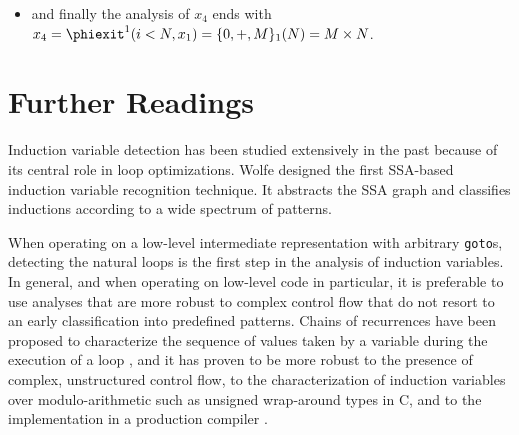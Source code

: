 {\begin{itemize}
\begin{itemize}
\begin{itemize}
    \item the analysis of $x_0$ leads to $x_0 = 0$
    \item analyzing $x_2$ triggers the analysis of $j$, $M$, and $x_3$
      \begin{itemize}
      \item $j = \CHREC{0, +, 1}_2$ i.e., the canonical loop counter $l_2$ of $\textit{loop}_2$.
      \item $M$ is a parameter
      \item $x_3 = \phientry^2 (x_1, x_3 + 1) = \CHREC{x_1, +, 1}_2$
      \end{itemize}
    \item $x_2 = \phientry^2 (j < M, x_3)$ is then computed as the last value of $x_3$ after
      $\textit{loop}_2$, i.e., it is the chain of recurrence of $x_3$ applied
      to the first iteration of $\textit{loop}_2$ that does not satisfy $j < M$ or equivalently $l_2<M$. The corresponding Diophantine inequality $l_2\geq M$  have minimum solution $l_2=M$. So, to finish the computation of the scalar evolution of
      $x_2$ we apply $M$ to the scalar evolution of $x_3$, leading
      to $x_2 = \CHREC{x_1, +, 1}_2 (M) = x_1 + M$;
    \end{itemize}
  \item the scalar evolution analysis of $x_1$ then leads to $x_1 = \phientry^1 (x_0, x_2) = \phientry^1 (x_0, x_1 + M) = \CHREC{x_0, +, M}_1 = \CHREC{0, +, M}_1$
  \end{itemize}
\item and finally the analysis of $x_4$ ends with $x_4 = \phiexit^1 (i< N, x_1) = \CHREC{0, +, M}_1 (N) = M \times N$.
\end{itemize}


\section{Further Readings}

Induction variable detection has been studied extensively in the past because of its central role in loop optimizations. 
Wolfe \cite{Wol92} designed the first SSA-based induction variable recognition technique. 
It abstracts the SSA graph and classifies inductions according to a wide spectrum of patterns.

When operating on a low-level intermediate representation with arbitrary \texttt{goto}s, detecting the natural loops is the first step in the analysis of induction variables. 
In general, and when operating on low-level code in particular, it is preferable to use analyses that are more robust to complex control flow that do not resort to an early classification into predefined patterns. 
Chains of recurrences \cite{BWZ94,KMZ98,Zim01} have been proposed to characterize the sequence of values taken by a variable during the execution of a loop \cite{vEn01}, and it has proven to be more robust to the presence of complex, unstructured control flow, to the characterization of induction variables over modulo-arithmetic such as unsigned wrap-around types in C, and to the implementation in a production compiler \cite{Pop05}.

}
